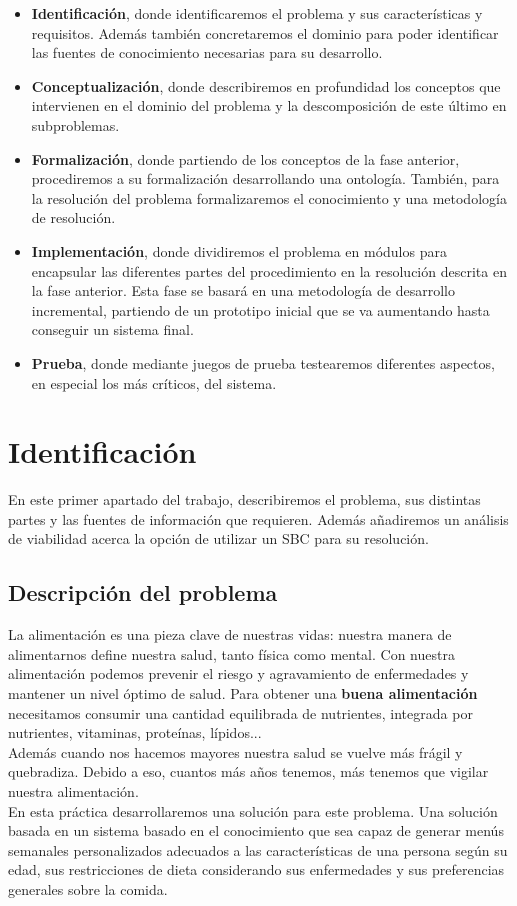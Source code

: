 \documentclass[12]{article}
\begin{document}
\begin{itemize}
	\item \textbf{Identificación}, donde identificaremos el problema y sus características y requisitos. Además también concretaremos el dominio para poder identificar las fuentes de conocimiento necesarias para su desarrollo.%
	\item \textbf{Conceptualización}, donde describiremos en profundidad los conceptos que intervienen en el dominio del problema y la descomposición de este último en subproblemas. %
	\item \textbf{Formalización}, donde partiendo de los conceptos de la fase anterior, procediremos a su formalización desarrollando una ontología. También, para la resolución del problema formalizaremos el conocimiento y una metodología de resolución.
\item \textbf{Implementación}, donde dividiremos el problema en módulos para encapsular las diferentes partes del procedimiento en la resolución descrita en la fase anterior. Esta fase se basará en una metodología de desarrollo incremental, partiendo de un prototipo inicial que se va aumentando hasta conseguir un sistema final. 
\item \textbf{Prueba}, donde mediante juegos de prueba testearemos diferentes aspectos, en especial los más críticos, del sistema. 
\end{itemize}

\section{Identificación}
En este primer apartado del trabajo, describiremos el problema, sus distintas partes y las fuentes de información que requieren. Además añadiremos un análisis de viabilidad acerca la opción de utilizar un SBC para su resolución.

\subsection{Descripción del problema}
La alimentación es una pieza clave de nuestras vidas: nuestra manera de alimentarnos define nuestra salud, tanto física como mental. Con nuestra alimentación podemos prevenir el riesgo y agravamiento de enfermedades y mantener un nivel óptimo de salud. Para obtener una \textbf{buena alimentación} necesitamos consumir una cantidad equilibrada de nutrientes, integrada por nutrientes, vitaminas, proteínas, lípidos...
\\
Además cuando nos hacemos mayores nuestra salud se vuelve más frágil y quebradiza. Debido a eso, cuantos más años tenemos, más tenemos que vigilar nuestra alimentación.
\\
En esta práctica desarrollaremos una solución para este problema. Una solución basada en un sistema basado en el conocimiento que sea capaz de generar menús semanales personalizados adecuados a las características de una persona según su edad, sus restricciones de dieta considerando sus enfermedades y sus preferencias generales sobre la comida.\\
\end{document}
